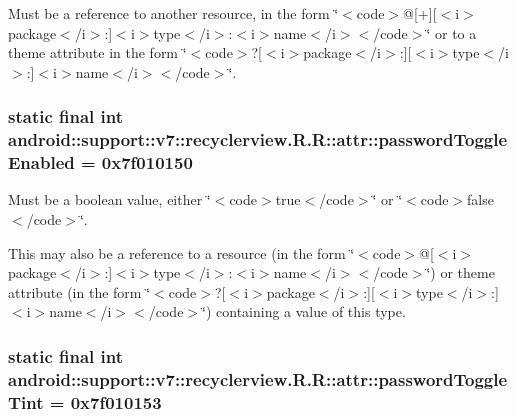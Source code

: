 Must be a reference to another resource, in the form \char`\"{}$<$code$>$@\mbox{[}+\mbox{]}\mbox{[}$<$i$>$package$<$/i$>$:\mbox{]}$<$i$>$type$<$/i$>$:$<$i$>$name$<$/i$>$$<$/code$>$\char`\"{} or to a theme attribute in the form \char`\"{}$<$code$>$?\mbox{[}$<$i$>$package$<$/i$>$:\mbox{]}\mbox{[}$<$i$>$type$<$/i$>$:\mbox{]}$<$i$>$name$<$/i$>$$<$/code$>$\char`\"{}. \hypertarget{classandroid_1_1support_1_1v7_1_1recyclerview_1_1_r_1_1attr_939172509db5b3930e65a35d0356c989}{
\subsubsection[{passwordToggleEnabled}]{\setlength{\rightskip}{0pt plus 5cm}static final int android::support::v7::recyclerview.R.R::attr::passwordToggleEnabled = 0x7f010150}}
\label{classandroid_1_1support_1_1v7_1_1recyclerview_1_1_r_1_1attr_939172509db5b3930e65a35d0356c989}


Must be a boolean value, either \char`\"{}$<$code$>$true$<$/code$>$\char`\"{} or \char`\"{}$<$code$>$false$<$/code$>$\char`\"{}. 

This may also be a reference to a resource (in the form \char`\"{}$<$code$>$@\mbox{[}$<$i$>$package$<$/i$>$:\mbox{]}$<$i$>$type$<$/i$>$:$<$i$>$name$<$/i$>$$<$/code$>$\char`\"{}) or theme attribute (in the form \char`\"{}$<$code$>$?\mbox{[}$<$i$>$package$<$/i$>$:\mbox{]}\mbox{[}$<$i$>$type$<$/i$>$:\mbox{]}$<$i$>$name$<$/i$>$$<$/code$>$\char`\"{}) containing a value of this type. \hypertarget{classandroid_1_1support_1_1v7_1_1recyclerview_1_1_r_1_1attr_4965390df125119151048efdf19c25ed}{
\subsubsection[{passwordToggleTint}]{\setlength{\rightskip}{0pt plus 5cm}static final int android::support::v7::recyclerview.R.R::attr::passwordToggleTint = 0x7f010153}}
\label{classandroid_1_1support_1_1v7_1_1recyclerview_1_1_r_1_1attr_4965390df125119151048efdf19c25ed}


